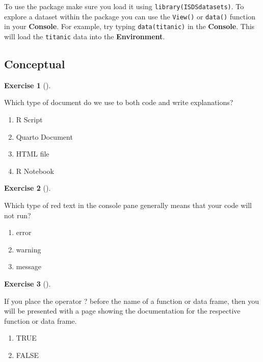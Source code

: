 \documentclass[
  letterpaper,
  DIV=11,
  numbers=noendperiod]{scrreprt}
\providecommand{\tightlist}{%
  \setlength{\itemsep}{0pt}\setlength{\parskip}{0pt}}\usepackage{longtable,booktabs,array}
\theoremstyle{definition}
\newtheorem{exercise}{Exercise}[chapter]
\theoremstyle{remark}
\begin{document}
To use the package make sure you load it using
\texttt{library(ISDSdatasets)}. To explore a dataset within the package
you can use the \texttt{View()} or \texttt{data()} function in your
\textbf{Console}. For example, try typing \texttt{data(titanic)} in the
\textbf{Console}. This will load the \texttt{titanic} data into the
\textbf{Environment}.

\hypertarget{sec-ex01-conceptual}{%
\subsection{Conceptual}\label{sec-ex01-conceptual}}

\begin{exercise}[]\protect\hypertarget{exr-ch01-c01}{}\label{exr-ch01-c01}

Which type of document do we use to both code and write explanations?

\begin{enumerate}
\def\labelenumi{\alph{enumi})}
\tightlist
\item
  R Script
\item
  Quarto Document
\item
  HTML file
\item
  R Notebook
\end{enumerate}

\end{exercise}

\begin{exercise}[]\protect\hypertarget{exr-ch01-c02}{}\label{exr-ch01-c02}

Which type of red text in the console pane generally means that your
code will not run?

\begin{enumerate}
\def\labelenumi{\alph{enumi})}
\tightlist
\item
  error
\item
  warning
\item
  message
\end{enumerate}

\end{exercise}

\begin{exercise}[]\protect\hypertarget{exr-ch01-c03}{}\label{exr-ch01-c03}

If you place the operator ? before the name of a function or data frame,
then you will be presented with a page showing the documentation for the
respective function or data frame.

\begin{enumerate}
\def\labelenumi{\alph{enumi})}
\tightlist
\item
  TRUE
\item
  FALSE
\end{enumerate}

\end{exercise}
\end{document}
